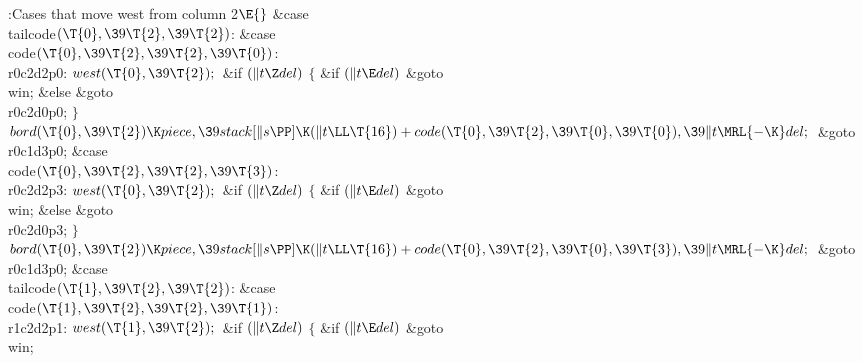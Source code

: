 \B{}:Cases that move west from column 2\X${}\E{}$\6
\4\&{case} \\{tailcode}${}(\T{0},\39\T{2},\39\T{2}){}$:\5
\&{case} \\{code}${}(\T{0},\39\T{2},\39\T{2},\39\T{0}){}$:\5
\\{r0c2d2p0}:\5
${}\\{west}(\T{0},\39\T{2});{}$\6
\&{if} ${}(\|t\Z\\{del}){}$\5
${}\{{}$\5
\1\&{if} ${}(\|t\E\\{del}){}$\1\5
\&{goto} \\{win};\5
\2\&{else}\1\5
\&{goto} \\{r0c2d0p0};\5
\2${}\}{}$\2\6
${}\\{bord}(\T{0},\39\T{2})\K\\{piece},\39\\{stack}[\|s\PP]\K(\|t\LL\T{16})+%
\\{code}(\T{0},\39\T{2},\39\T{0},\39\T{0}),\39\|t\MRL{-{\K}}\\{del};{}$\6
\&{goto} \\{r0c1d3p0};\6
\4\&{case} \\{code}${}(\T{0},\39\T{2},\39\T{2},\39\T{3}){}$:\5
\\{r0c2d2p3}:\5
${}\\{west}(\T{0},\39\T{2});{}$\6
\&{if} ${}(\|t\Z\\{del}){}$\5
${}\{{}$\5
\1\&{if} ${}(\|t\E\\{del}){}$\1\5
\&{goto} \\{win};\5
\2\&{else}\1\5
\&{goto} \\{r0c2d0p3};\5
\2${}\}{}$\2\6
${}\\{bord}(\T{0},\39\T{2})\K\\{piece},\39\\{stack}[\|s\PP]\K(\|t\LL\T{16})+%
\\{code}(\T{0},\39\T{2},\39\T{0},\39\T{3}),\39\|t\MRL{-{\K}}\\{del};{}$\6
\&{goto} \\{r0c1d3p0};\6
\4\&{case} \\{tailcode}${}(\T{1},\39\T{2},\39\T{2}){}$:\5
\&{case} \\{code}${}(\T{1},\39\T{2},\39\T{2},\39\T{1}){}$:\5
\\{r1c2d2p1}:\5
${}\\{west}(\T{1},\39\T{2});{}$\6
\&{if} ${}(\|t\Z\\{del}){}$\5
${}\{{}$\5
\1\&{if} ${}(\|t\E\\{del}){}$\1\5
\&{goto} \\{win};\5
